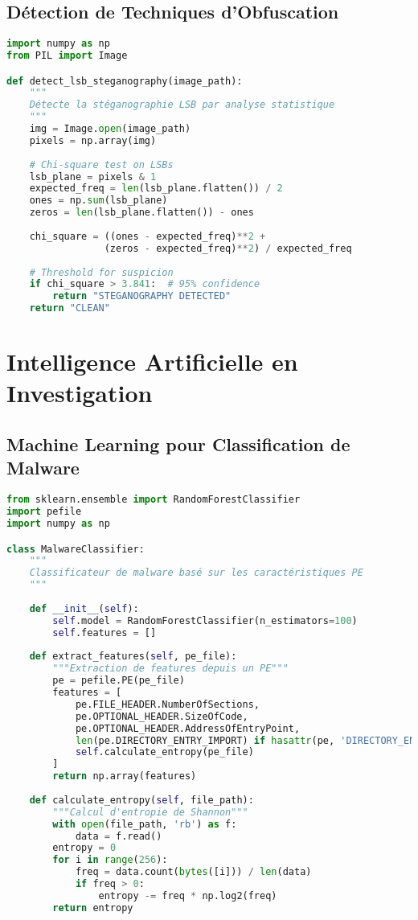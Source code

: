 \subsection{Détection de Techniques d'Obfuscation}
\begin{lstlisting}[language=Python, caption=Détection de stéganographie]
import numpy as np
from PIL import Image

def detect_lsb_steganography(image_path):
    """
    Détecte la stéganographie LSB par analyse statistique
    """
    img = Image.open(image_path)
    pixels = np.array(img)
    
    # Chi-square test on LSBs
    lsb_plane = pixels & 1
    expected_freq = len(lsb_plane.flatten()) / 2
    ones = np.sum(lsb_plane)
    zeros = len(lsb_plane.flatten()) - ones
    
    chi_square = ((ones - expected_freq)**2 +
                 (zeros - expected_freq)**2) / expected_freq
    
    # Threshold for suspicion
    if chi_square > 3.841:  # 95% confidence
        return "STEGANOGRAPHY DETECTED"
    return "CLEAN"
\end{lstlisting}

\section{Intelligence Artificielle en Investigation}
\subsection{Machine Learning pour Classification de Malware}
\begin{lstlisting}[language=Python, caption=Classificateur de malware]
from sklearn.ensemble import RandomForestClassifier
import pefile
import numpy as np

class MalwareClassifier:
    """
    Classificateur de malware basé sur les caractéristiques PE
    """
    
    def __init__(self):
        self.model = RandomForestClassifier(n_estimators=100)
        self.features = []
    
    def extract_features(self, pe_file):
        """Extraction de features depuis un PE"""
        pe = pefile.PE(pe_file)
        features = [
            pe.FILE_HEADER.NumberOfSections,
            pe.OPTIONAL_HEADER.SizeOfCode,
            pe.OPTIONAL_HEADER.AddressOfEntryPoint,
            len(pe.DIRECTORY_ENTRY_IMPORT) if hasattr(pe, 'DIRECTORY_ENTRY_IMPORT') else 0,
            self.calculate_entropy(pe_file)
        ]
        return np.array(features)
    
    def calculate_entropy(self, file_path):
        """Calcul d'entropie de Shannon"""
        with open(file_path, 'rb') as f:
            data = f.read()
        entropy = 0
        for i in range(256):
            freq = data.count(bytes([i])) / len(data)
            if freq > 0:
                entropy -= freq * np.log2(freq)
        return entropy
\end{lstlisting}

